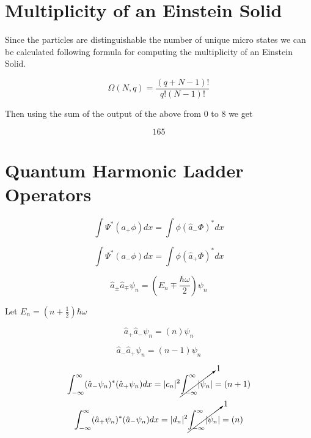 \documentclass[12pt]{article}
\begin{document}
\maketitle

\section{Multiplicity of an Einstein Solid}

Since the particles are distinguishable the number of unique micro states we can be calculated following formula for computing the multiplicity of an Einstein Solid.

\begin{equation}
  \Omega(N,q)=\frac{(q + N - 1)!}{q! (N-1)!}
\end{equation}

Then using the sum of the output of the above from 0 to 8 we get

\begin{equation}
  \boxed{165}
\end{equation}

\section{Quantum Harmonic Ladder Operators}

\begin{equation}
  \int\Psi^*(a_+\phi)dx=\int\phi(\hat{a}_-\Phi)^*dx
\end{equation}

\begin{equation}
  \int\Psi^*(a_-\phi)dx=\int\phi(\hat{a}_+\Phi)^*dx
\end{equation}

\begin{equation}
  \hat{a}_\pm\hat{a}_\mp\psi_n=(E_n\mp\frac{\hbar\omega}{2})\psi_n
\end{equation}

Let $E_n=(n+\frac{1}{2})\hbar\omega$

\begin{equation}
  \hat{a}_+\hat{a}_-\psi_n=(n)\psi_n
\end{equation}

\begin{equation}
  \hat{a}_-\hat{a}_+\psi_n=(n-1)\psi_n
\end{equation}

\begin{equation}
  \int_{-\infty}^\infty (\hat{a}_-\psi_n)^*(\hat{a}_+\psi_n)dx=\lvert c_n \rvert^2 \cancelto{1}{\int_{-\infty}^\infty\lvert \psi_{n} \rvert} = (n+1)
\end{equation}
\begin{equation}
  \int_{-\infty}^\infty (\hat{a}_+\psi_n)^*(\hat{a}_-\psi_n)dx=\lvert d_n \rvert^2 \cancelto{1}{\int_{-\infty}^\infty\lvert \psi_{n} \rvert} = (n)
\end{equation}
\end{document}
